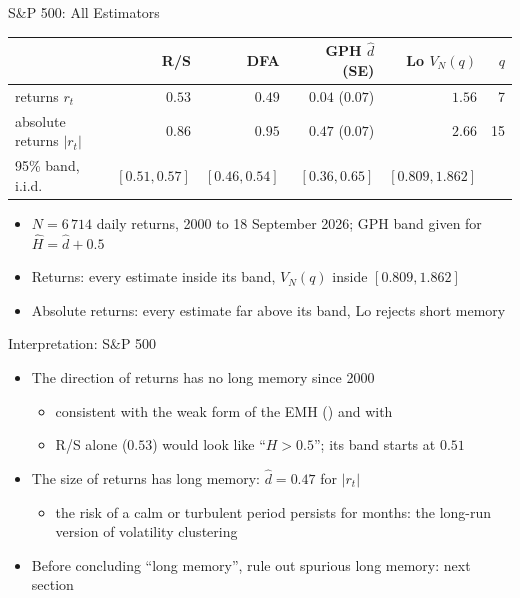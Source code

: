 \begin{frame}{S\&P 500: All Estimators}
\itemsize{\small}
\begin{center}
\footnotesize
\begin{tabular}{lrrrrr}
\toprule
 & R/S & DFA & GPH $\hat d$ (SE) & Lo $V_N(q)$ & $q$ \\
\midrule
returns $r_t$ & $0.53$ & $0.49$ & $0.04$ ($0.07$) & $1.56$ & 7 \\
absolute returns $|r_t|$ & $0.86$ & $0.95$ & $0.47$ ($0.07$) & $2.66$ & 15 \\
95\% band, i.i.d. & $[0.51, 0.57]$ & $[0.46, 0.54]$ & $[0.36, 0.65]$ & $[0.809, 1.862]$ &  \\
\bottomrule
\end{tabular}
\end{center}
\begin{itemize}
    \item $N = 6\,714$ daily returns, 2000 to 18 September 2026; GPH band given for $\hat H = \hat d + 0.5$
    \item Returns: every estimate inside its band, $V_N(q)$ inside $[0.809, 1.862]$
    \item Absolute returns: every estimate far above its band, Lo rejects short memory
\end{itemize}
\end{frame}

\begin{frame}{Interpretation: S\&P 500}
\itemsize{\small}
\begin{itemize}
    \item The direction of returns has no long memory since 2000
    \begin{itemize}
        \item consistent with the weak form of the EMH () and with 
        \item R/S alone ($0.53$) would look like ``$H > 0.5$''; its band starts at $0.51$
    \end{itemize}
    \item The size of returns has long memory: $\hat d = 0.47$ for $|r_t|$
    \begin{itemize}
        \item the risk of a calm or turbulent period persists for months: the long-run version of volatility clustering
    \end{itemize}
    \item Before concluding ``long memory'', rule out spurious long memory: next section
\end{itemize}
\end{frame}


